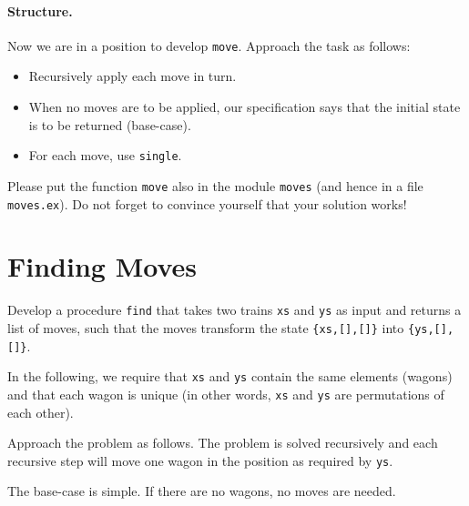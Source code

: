 \documentclass[a4paper,11pt]{article}
\begin{document}
\paragraph{Structure.}

Now we are in a position to develop \verb+move+. Approach the
task as follows:
\begin{itemize}

\item Recursively apply each move in turn.
  
\item When no moves are to be applied, our specification says
  that the initial state is to be returned (base-case).
  
\item For each move, use \verb+single+.
\end{itemize}

Please put the function \verb+move+ also in the module \verb+moves+
(and hence in a file \verb+moves.ex+).  Do not forget to convince
yourself that your solution works!


\section{Finding Moves}

Develop a procedure \verb+find+ that takes two trains \verb+xs+
and \verb+ys+ as input and returns a list of moves, such that the
moves transform the state \verb+{xs,[],[]}+ into
\verb+{ys,[],[]}+.

In the following, we require that \verb+xs+ and \verb+ys+ contain the
same elements (wagons) and that each wagon is unique (in other
words, \verb+xs+ and \verb+ys+ are permutations of each other).

Approach the problem as follows. The problem is solved
recursively and each recursive step will move one wagon in the
position as required by \verb+ys+.

The base-case is simple. If there are no wagons, no moves are
needed.
\end{document}
